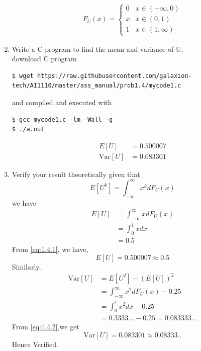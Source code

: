 \documentclass[journal,12pt,twocolumn]{IEEEtran}
\renewcommand\thesection{\arabic{section}}
\begin{document}
\begin{enumerate}[label=\thesection.\arabic*.,ref=\thesection.\theenumi]
    \begin{align}
    F_U(x) =  \begin{cases}
        0 & x \in (-\infty,0)\\
        x & x \in (0,1) \\
        1 & x \in (1,\infty)
    \end{cases} 
    \end{align}


\item Write a C program to find the mean and variance of U.\\

\solution download C program

\begin{lstlisting}
$ wget https://raw.githubusercontent.com/galaxion-tech/AI1110/master/ass_manual/prob1.4/mycode1.c
        \end{lstlisting}
        and compiled and executed with
        \begin{lstlisting}
$ gcc mycode1.c -lm -Wall -g
$ ./a.out
        \end{lstlisting}
    \begin{align}
        E[U] &= 0.500007  \label{eq:1.4.1}\\
        \text{Var}[U] &= 0.083301 \label{eq:1.4.2}
    \end{align}
\item Verify your result theoretically given that 
    \begin{equation}
        E[U^k] = \int_{- \infty}^{\infty} x^k dF_U(x)
    \end{equation}
    \solution we have 
    \begin{align}
        E[U] &= \int_{-\infty}^{\infty} xdF_U(x) \\
        &= \int_{0}^1 x dx \\
        &=  0.5
    \end{align}
    From \eqref{eq:1.4.1}, we have, 
    \begin{equation}
        E[U] = 0.500007 \approx 0.5
    \end{equation}
    Similarly,
    \begin{align}
        \text{Var}[U]&=E[U^2]-(E[U])^2 \\
        &=\int_{-\infty}^{\infty}x^2dF_U(x) - 0.25\\
        &=\int_{0}^{1}x^2dx - 0.25\\
        &=0.3333...-0.25=0.083333...
    \end{align}
    From \eqref{eq:1.4.2},we get
    \begin{equation}
        \text{Var}[U] = 0.083301 \approx 0.08333..
    \end{equation}
    Hence Verified.
\end{enumerate}
\end{document}
